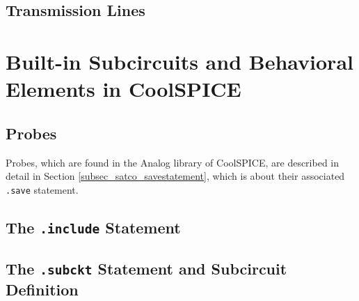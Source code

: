 \subsection{Transmission Lines}
\label{subsec_sceadm_transmissionlines}

\section{Built-in Subcircuits and Behavioral Elements in CoolSPICE}
\label{sec_sceadm_builtinsubcircuits}

\subsection{Probes}
\label{subsec_sceadm_probes}

Probes, which are found in the \textsf{Analog} library of CoolSPICE, are described in detail in Section \ref{subsec_satco_savestatement}, which is about their associated \texttt{.save} statement.  

\subsection{The \texttt{.include} Statement}
\label{sec_sceadm_includestatement}

\subsection{The \texttt{.subckt} Statement and Subcircuit Definition}
\label{sec_sceadm_subcktstatement}

